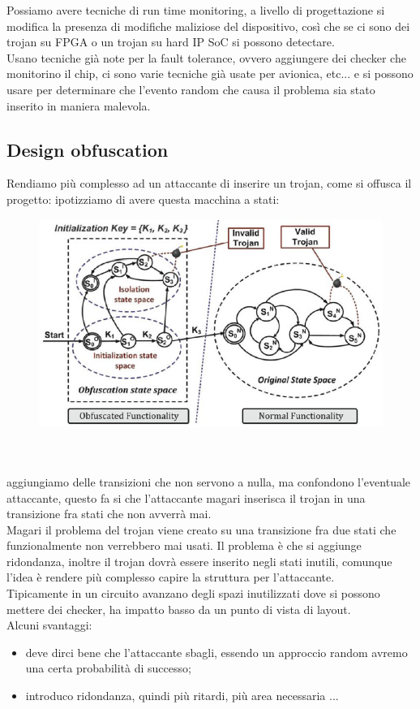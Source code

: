 \documentclass[oneside, 12pt]{extbook}
\begin{document}
Possiamo avere tecniche di run time monitoring, a livello di progettazione si modifica la presenza di modifiche maliziose del dispositivo, così che se ci sono dei trojan su FPGA o un trojan su hard IP SoC si possono detectare.
\\Usano tecniche già note per la fault tolerance, ovvero aggiungere dei checker che monitorino il chip, ci sono varie tecniche già usate per avionica, etc... e si possono usare per determinare che l'evento random che causa il problema sia stato inserito in maniera malevola.

\subsection{Design obfuscation}
Rendiamo più complesso ad un attaccante di inserire un trojan, come si offusca il progetto: ipotizziamo di avere questa macchina a stati:\\
\begin{figure}[!h]
	\includegraphics[scale=0.5]{immagini/hardware/fsm_obf.png}
\end{figure}
\\\\aggiungiamo delle transizioni che non servono a nulla, ma confondono l'eventuale attaccante, questo fa si che l'attaccante magari inserisca il trojan in una transizione fra stati che non avverrà mai.
\\Magari il problema del trojan viene creato su una transizione fra due stati che funzionalmente non verrebbero mai usati. Il problema è che si aggiunge ridondanza, inoltre il trojan dovrà essere inserito negli stati inutili, comunque l'idea è rendere più complesso capire la struttura per l'attaccante.
\\Tipicamente in un circuito avanzano degli spazi inutilizzati dove si possono mettere dei checker, ha impatto basso da un punto di vista di layout.
\\Alcuni svantaggi:
\begin{itemize}
	\item deve dirci bene che l'attaccante sbagli, essendo un approccio random avremo una certa probabilità di successo;
	\item introduco ridondanza, quindi più ritardi, più area necessaria ...
\end{itemize}
\end{document}
